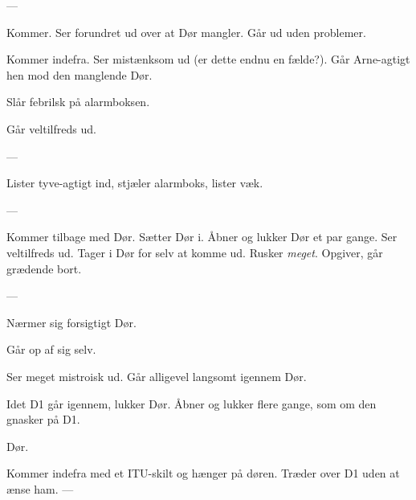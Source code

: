 \documentclass[danish]{article}
\begin{document}
\begin{sketch}
---

 Kommer. Ser forundret ud over at Dør mangler. Går ud uden problemer.

 Kommer indefra. Ser mistænksom ud (er dette endnu en fælde?). Går Arne-agtigt
hen mod den manglende Dør.


 Slår febrilsk på alarmboksen.


 Går veltilfreds ud.

---

 Lister tyve-agtigt ind, stjæler alarmboks, lister væk.

---

 Kommer tilbage med Dør. Sætter Dør i. Åbner og lukker Dør et par
gange. Ser veltilfreds ud. Tager i Dør for selv at komme ud. Rusker \emph{meget}.
Opgiver, går grædende bort.

---

 Nærmer sig forsigtigt Dør.

 Går op af sig selv.

 Ser meget mistroisk ud. Går alligevel langsomt igennem Dør.

 Idet D1 går igennem, lukker Dør. Åbner og lukker flere gange, som om
den gnasker på D1.

 Dør.

 Kommer indefra med et ITU-skilt og hænger på døren. Træder over D1 uden at ænse ham.
---

\end{sketch}
\end{document}
